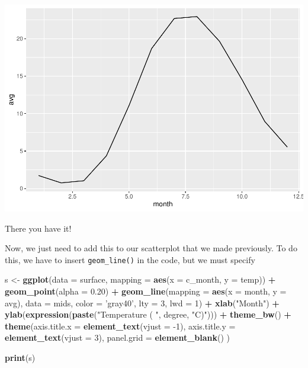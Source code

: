 \documentclass[
]{book}
\newenvironment{Shaded}{\begin{snugshade}}{\end{snugshade}}
\newcommand{\DataTypeTok}[1]{\textcolor[rgb]{0.13,0.29,0.53}{#1}}
\newcommand{\DecValTok}[1]{\textcolor[rgb]{0.00,0.00,0.81}{#1}}
\newcommand{\FloatTok}[1]{\textcolor[rgb]{0.00,0.00,0.81}{#1}}
\newcommand{\KeywordTok}[1]{\textcolor[rgb]{0.13,0.29,0.53}{\textbf{#1}}}
\newcommand{\NormalTok}[1]{#1}
\newcommand{\OperatorTok}[1]{\textcolor[rgb]{0.81,0.36,0.00}{\textbf{#1}}}
\newcommand{\StringTok}[1]{\textcolor[rgb]{0.31,0.60,0.02}{#1}}
\begin{document}
\includegraphics{worstr_files/figure-latex/unnamed-chunk-110-1.pdf}

There you have it!

Now, we just need to add this to our scatterplot that we made previously. To do this, we have to insert \texttt{geom\_line()} in the code, but we must specify

\begin{Shaded}
\begin{Highlighting}[]
\NormalTok{s <-}\StringTok{ }\KeywordTok{ggplot}\NormalTok{(}\DataTypeTok{data =}\NormalTok{ surface, }\DataTypeTok{mapping =} \KeywordTok{aes}\NormalTok{(}\DataTypeTok{x =}\NormalTok{ c_month, }\DataTypeTok{y =}\NormalTok{ temp)) }\OperatorTok{+}
\StringTok{  }\KeywordTok{geom_point}\NormalTok{(}\DataTypeTok{alpha =} \FloatTok{0.20}\NormalTok{) }\OperatorTok{+}\StringTok{ }
\StringTok{  }\KeywordTok{geom_line}\NormalTok{(}\DataTypeTok{mapping =} \KeywordTok{aes}\NormalTok{(}\DataTypeTok{x =}\NormalTok{ month, }\DataTypeTok{y =}\NormalTok{ avg),}
            \DataTypeTok{data =}\NormalTok{ mids,}
            \DataTypeTok{color =} \StringTok{'gray40'}\NormalTok{,}
            \DataTypeTok{lty =} \DecValTok{3}\NormalTok{,}
            \DataTypeTok{lwd =} \DecValTok{1}\NormalTok{) }\OperatorTok{+}
\StringTok{  }\KeywordTok{xlab}\NormalTok{(}\StringTok{"Month"}\NormalTok{) }\OperatorTok{+}
\StringTok{  }\KeywordTok{ylab}\NormalTok{(}\KeywordTok{expression}\NormalTok{(}\KeywordTok{paste}\NormalTok{(}\StringTok{"Temperature ( "}\NormalTok{, degree, }\StringTok{"C)"}\NormalTok{))) }\OperatorTok{+}
\StringTok{  }\KeywordTok{theme_bw}\NormalTok{() }\OperatorTok{+}
\StringTok{  }\KeywordTok{theme}\NormalTok{(}\DataTypeTok{axis.title.x =} \KeywordTok{element_text}\NormalTok{(}\DataTypeTok{vjust =} \DecValTok{-1}\NormalTok{),}
        \DataTypeTok{axis.title.y =} \KeywordTok{element_text}\NormalTok{(}\DataTypeTok{vjust =} \DecValTok{3}\NormalTok{),}
        \DataTypeTok{panel.grid =} \KeywordTok{element_blank}\NormalTok{()}
\NormalTok{  )}

\KeywordTok{print}\NormalTok{(s)}
\end{Highlighting}
\end{Shaded}
\end{document}
